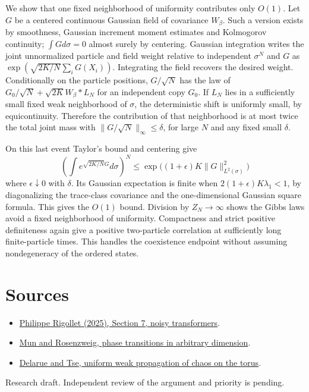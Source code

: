 \documentclass[10pt]{article}
\begin{document}
We show that one fixed neighborhood of uniformity contributes only $O(1)$. Let $G$ be a centered continuous Gaussian field of covariance $W_\beta$. Such a version exists by smoothness, Gaussian increment moment estimates and Kolmogorov continuity; $\int Gd\sigma=0$ almost surely by centering. Gaussian integration writes the joint unnormalized particle and field weight relative to independent $\sigma^N$ and $G$ as $\exp(\sqrt{2K/N}\sum_iG(X_i))$. Integrating the field recovers the desired weight. Conditionally on the particle positions, $G/\sqrt N$ has the law of $G_0/\sqrt N+\sqrt{2K}W_\beta*L_N$ for an independent copy $G_0$. If $L_N$ lies in a sufficiently small fixed weak neighborhood of $\sigma$, the deterministic shift is uniformly small, by equicontinuity. Therefore the contribution of that neighborhood is at most twice the total joint mass with $\|G/\sqrt N\|_\infty\le\delta$, for large $N$ and any fixed small $\delta$.

On this last event Taylor's bound and centering give
\[
 \left(\int e^{\sqrt{2K/N}G}d\sigma\right)^N
 \le \exp\big((1+\epsilon)K\|G\|_{L^2(\sigma)}^2\big)
\]
where $\epsilon\downarrow0$ with $\delta$. Its Gaussian expectation is finite when $2(1+\epsilon)K\lambda_1<1$, by diagonalizing the trace-class covariance and the one-dimensional Gaussian square formula. This gives the $O(1)$ bound. Division by $Z_N\to\infty$ shows the Gibbs laws avoid a fixed neighborhood of uniformity. Compactness and strict positive definiteness again give a positive two-particle correlation at sufficiently long finite-particle times. This handles the coexistence endpoint without assuming nondegeneracy of the ordered states.

\section*{Sources}
\begin{itemize}
\item \href{https://arxiv.org/abs/2512.01868}{Philippe Rigollet (2025), Section 7, noisy transformers}.
\item \href{https://arxiv.org/abs/2606.05140}{Mun and Rosenzweig, phase transitions in arbitrary dimension}.
\item \href{https://doi.org/10.1214/23-AIHP1451}{Delarue and Tse, uniform weak propagation of chaos on the torus}.
\end{itemize}
{\small Research draft. Independent review of the argument and priority is pending.}
\end{document}
